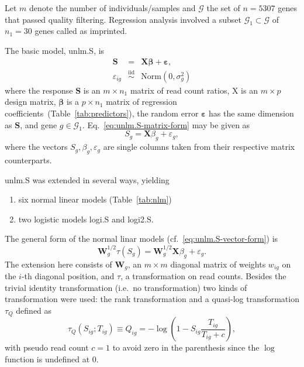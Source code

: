 \documentclass[letterpaper]{article}
\begin{document}
Let \(m\) denote the number of individuals/samples and \(\mathcal{G}\) the set
of \(n=5307\) genes that passed quality filtering.  Regression analysis
involved a subset \(\mathcal{G}_1\subset\mathcal{G}\) of \(n_1=30\) genes
called as imprinted.

The basic model, unlm.S, is
\begin{eqnarray}
\mathbf{S} &=& \mathbf{X} \boldsymbol{\beta} + \boldsymbol{\varepsilon},
\label{eq:unlm.S-matrix-form} \\
\varepsilon_{ig} &\overset{\mathrm{iid}}{\sim}& \mathrm{Norm}(0, \sigma^2_g)
\end{eqnarray}
where the response \(\mathbf{S}\) is an \(m\times n_1\) matrix of read count ratios,
\(\mathrm{X}\) is an \(m\times p\) design matrix, \(\boldsymbol{\beta}\) is a \(p\times n_1\) matrix of regression
coefficients~(Table~\ref{tab:predictors}), the random error \(\boldsymbol{\varepsilon}\) has the same
dimension as \(\mathbf{S}\), and gene \(g\in \mathcal{G}_1\).  Eq.~\ref{eq:unlm.S-matrix-form} may be given as
\begin{equation}
S_g = \mathbf{X} \beta_g + \varepsilon_g,
\label{eq:unlm.S-vector-form}
\end{equation}
where the vectors \(S_g, \beta_g, \varepsilon_g\)
are single columns taken from their respective matrix counterparts.

unlm.S was extended in several ways, yielding
\begin{enumerate}
\item six normal linear models (Table~\ref{tab:nlm})
\item two logistic models logi.S and logi2.S.
\end{enumerate}

The general form of the normal linar models
(cf.~\ref{eq:unlm.S-vector-form}) is
\begin{equation}
\mathbf{W}_g^{1/2} \tau(S_g) = \mathbf{W}_g^{1/2} \mathbf{X} \beta_g + \varepsilon_g.
\label{eq:nlm-general}
\end{equation}
The extension here consists of \(\mathbf{W}_g\), an \(m\times m\) diagonal matrix of
weights \(w_{ig}\) on the \(i\)-th diagonal position, and \(\tau\), a
transformation on read counts.  Besides the trivial identity transformation
(i.e.~no transformation) two kinds of transformation were used: the rank
transformation and a quasi-log transformation \(\tau_Q\) defined as
\begin{equation}
\tau_Q(S_{ig};T_{ig}) \equiv Q_{ig} = - \log \left( 1 - S_{ig} \frac{T_{ig}}{T_{ig} + c}
\right),
\end{equation}
with pseudo read count \(c=1\) to avoid zero in the parenthesis since the \(\log\)
function is undefined at \(0\).
\end{document}
